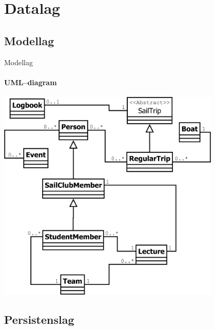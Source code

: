 \section{Datalag}


\subsection{Modellag}

\begin{frame}{Modellag}
  \framesubtitle{UML--diagram}
  \begin{center}
    \includegraphics[width=0.8\textwidth,height=0.8\textheight,keepaspectratio]{images/UML.png}
  \end{center}
\end{frame}


\subsection{Persistenslag}

